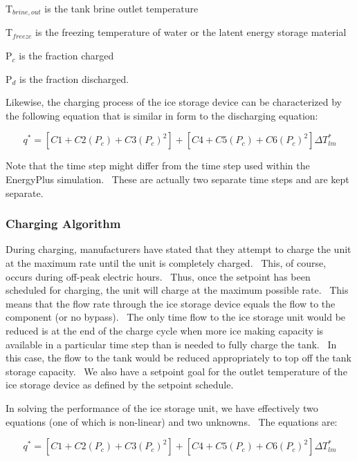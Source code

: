 T\(_{brine,out}\) is the tank brine outlet temperature

T\(_{freeze}\) is the freezing temperature of water or the latent energy storage material

P\(_{c}\) is the fraction charged

P\(_{d}\) is the fraction discharged.

Likewise, the charging process of the ice storage device can be characterized by the following equation that is similar in form to the discharging equation:

\begin{equation}
{q^*} = \left[ {C1 + C2\left( {{P_c}} \right) + C3{{\left( {{P_c}} \right)}^2}} \right] + \left[ {C4 + C5\left( {{P_c}} \right) + C6{{\left( {{P_c}} \right)}^2}} \right]\Delta T_{lm}^*
\end{equation}

Note that the time step might differ from the time step used within the EnergyPlus simulation.~ These are actually two separate time steps and are kept separate.

\subsubsection{Charging Algorithm}\label{charging-algorithm}

During charging, manufacturers have stated that they attempt to charge the unit at the maximum rate until the unit is completely charged.~ This, of course, occurs during off-peak electric hours.~ Thus, once the setpoint has been scheduled for charging, the unit will charge at the maximum possible rate.~ This means that the flow rate through the ice storage device equals the flow to the component (or no bypass).~ The only time flow to the ice storage unit would be reduced is at the end of the charge cycle when more ice making capacity is available in a particular time step than is needed to fully charge the tank.~ In this case, the flow to the tank would be reduced appropriately to top off the tank storage capacity. ~We also have a setpoint goal for the outlet temperature of the ice storage device as defined by the setpoint schedule.

In solving the performance of the ice storage unit, we have effectively two equations (one of which is non-linear) and two unknowns.~ The equations are:

\begin{equation}
{q^*} = \left[ {C1 + C2\left( {{P_c}} \right) + C3{{\left( {{P_c}} \right)}^2}} \right] + \left[ {C4 + C5\left( {{P_c}} \right) + C6{{\left( {{P_c}} \right)}^2}} \right]\Delta T_{lm}^*
\end{equation}

